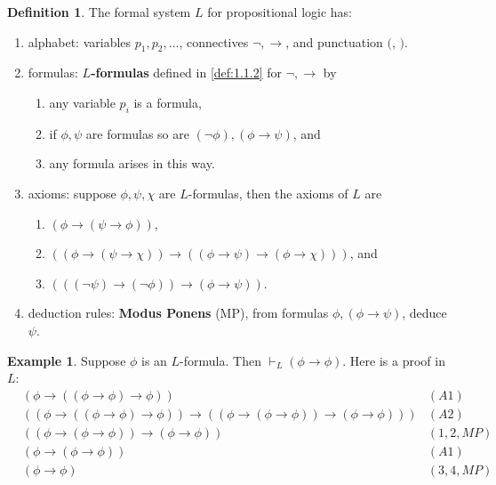 \documentclass{article}
\newcommand{\rb}[1]{\left( #1 \right)}
\newcommand{\notb}[1]{\rb{\neg #1}}
\newcommand{\impb}[2]{\rb{#1 \rightarrow #2}}
\theoremstyle{definition}\newtheorem{definition}{Definition}[subsection]
\theoremstyle{definition}\newtheorem{remark}[definition]{Remark}
\theoremstyle{definition}\newtheorem*{example}{Example}
\theoremstyle{definition}\newtheorem*{note}{Note}
\begin{document}
\begin{definition}
\label{def:1.2.3}
The formal system \textbf{$ L $} for propositional logic has:
\begin{enumerate}
\item alphabet: variables $ p_1, p_2, \dots $, connectives $ \neg, \rightarrow $, and punctuation $ ( $, $ ) $.
\item formulas: \textbf{$ L $-formulas} defined in \ref{def:1.1.2} for $ \neg, \rightarrow $ by
\begin{enumerate}
\item any variable $ p_i $ is a formula,
\item if $ \phi, \psi $ are formulas so are $ \notb{\phi}, \impb{\phi}{\psi} $, and
\item any formula arises in this way.
\end{enumerate}
\item axioms: suppose $ \phi, \psi, \chi $ are $ L $-formulas, then the axioms of $ L $ are
\begin{enumerate}[label=(A\arabic*)]
\item $ \impb{\phi}{\impb{\psi}{\phi}} $,
\item $ \impb{\impb{\phi}{\impb{\psi}{\chi}}}{\impb{\impb{\phi}{\psi}}{\impb{\phi}{\chi}}} $, and
\item $ \impb{\impb{\notb{\psi}}{\notb{\phi}}}{\impb{\phi}{\psi}} $.
\end{enumerate}
\item deduction rules: \textbf{Modus Ponens} (MP), from formulas $ \phi, \impb{\phi}{\psi} $, deduce $ \psi $.
\end{enumerate}
\end{definition}

\begin{example}
Suppose $ \phi $ is an $ L $-formula. Then $ \vdash_L \impb{\phi}{\phi} $. Here is a proof in $ L $:
\begin{align*}
& \impb{\phi}{\impb{\impb{\phi}{\phi}}{\phi}} & \rb{A1} \\
& \impb{\impb{\phi}{\impb{\impb{\phi}{\phi}}{\phi}}}{\impb{\impb{\phi}{\impb{\phi}{\phi}}}{\impb{\phi}{\phi}}} & \rb{A2} \\
& \impb{\impb{\phi}{\impb{\phi}{\phi}}}{\impb{\phi}{\phi}} & \rb{1, 2, MP} \\
& \impb{\phi}{\impb{\phi}{\phi}} & \rb{A1} \\
& \impb{\phi}{\phi} & \rb{3, 4, MP}
\end{align*}
\end{example}
\end{document}

